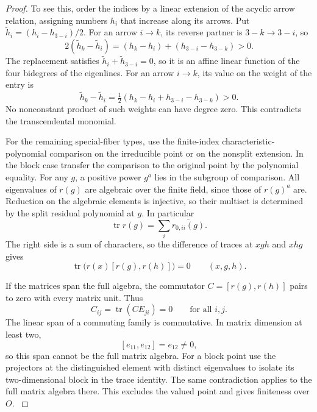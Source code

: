 \begin{proof}
To see this, order the indices
by a linear extension of the acyclic arrow relation, assigning
numbers \(h_i\) that increase along its arrows. Put \(\widetilde h_i=(h_i-h_{3-i})/2\). For an arrow \(i\to k\), its reverse partner is \(3-k\to3-i\), so
\[
 2(\widetilde h_k-\widetilde h_i)
 =(h_k-h_i)+(h_{3-i}-h_{3-k})>0 .
\] The replacement satisfies
\(\widetilde h_i+\widetilde h_{3-i}=0\), so it is an affine linear
function of the four bidegrees of the eigenlines.
For an arrow \(i\to k\), its value on the weight of the entry is
\[
   \widetilde h_k-\widetilde h_i
     =\tfrac12(h_k-h_i+h_{3-i}-h_{3-k})>0 .
\]
No nonconstant product of such weights can have degree zero. This contradicts the transcendental
monomial.

For the remaining special-fiber types, use the finite-index
characteristic-polynomial comparison on the irreducible point or
on the nonsplit extension. In the block case transfer the
comparison to the original point by the polynomial equality.
For any \(g\), a positive power \(g^a\)
lies in the subgroup of comparison. All eigenvalues of \(r(g)\)
are algebraic over the finite field, since those of \(r(g)^a\)
are. Reduction on the algebraic elements is injective, so their
multiset is determined by the split residual polynomial at \(g\).
In particular
\[
             \operatorname{tr}r(g)=\sum_i\overline{r_{0,ii}(g)}.
\]
The right side is a sum of characters, so the difference of
traces at \(xgh\) and \(xhg\) gives
\[
      \operatorname{tr}\big(r(x)[r(g),r(h)]\big)=0\qquad(x,g,h).
\]

If the matrices span the full algebra, the commutator \(C=[r(g),r(h)]\) pairs to zero with every matrix unit. Thus
\[
 C_{ij}=\operatorname{tr}(C E_{ji})=0
 \qquad\text{for all }i,j.
\]
The linear span of a commuting family is commutative. In matrix dimension at least two,
\[
 [e_{11},e_{12}]=e_{12}\ne0,
\]
so this span cannot be the full matrix algebra.
For a block point use the projectors at the distinguished
element with distinct eigenvalues to isolate its two-dimensional
block in the trace identity. The same contradiction applies to
the full matrix algebra there. This excludes the valued point
and gives finiteness over \(O\).
\label{cor:ordinary-symplectic-cohomology-10}


\end{proof}

